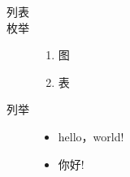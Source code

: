 \documentclass[a4paper]{article}
\newcommand{\sectionbreak}{\clearpage} %
\theoremstyle{definition}
\theoremstyle{plain}
\theoremstyle{remark}
\begin{document}
\begin{description}
	\item[列表]
	\item[枚举] \begin{enumerate}
			\item 图
			\item 表
		\end{enumerate}
	\item[列举] \begin{itemize}
			\item hello，world!

			\item 你好! \cite{Varju2018}
		\end{itemize}
\end{description}



\sectionbreak

\end{document}
